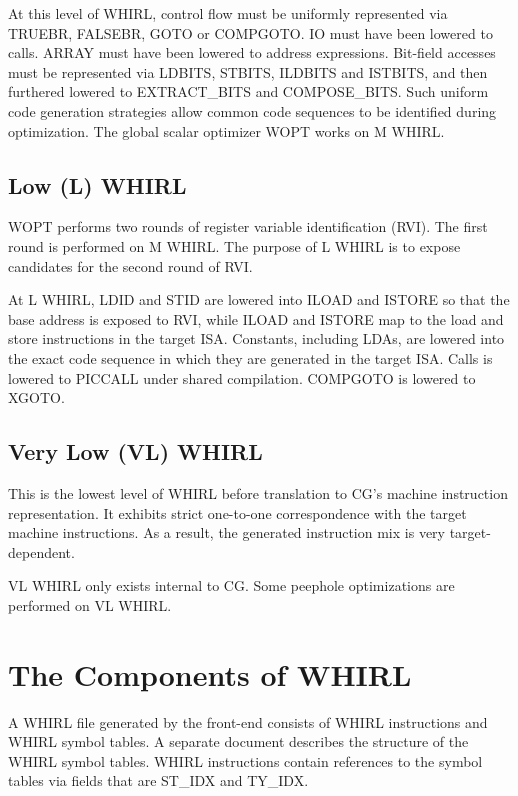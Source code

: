 \documentclass{article}
\begin{document}
At this level of WHIRL, control flow must be uniformly represented
via TRUEBR, FALSEBR, GOTO or COMPGOTO. IO must have been lowered
to calls.
ARRAY must have been lowered to address expressions. Bit-field accesses
must be represented via
LDBITS, STBITS, ILDBITS and ISTBITS, and then furthered lowered to
EXTRACT\_BITS and COMPOSE\_BITS. Such uniform code generation strategies
allow common code sequences to be
identified during optimization. The global scalar optimizer WOPT
works on M WHIRL.

\subsection{Low (L) WHIRL}

WOPT performs two rounds of register variable identification (RVI).
The first round is performed on M WHIRL. The purpose of L WHIRL is
to expose candidates for the second round of RVI. 

At L WHIRL, LDID
and STID are lowered into ILOAD and ISTORE so that the base address
is exposed to RVI, while
ILOAD and ISTORE map to the load and store instructions in the target
ISA. Constants, including
LDAs, are lowered into the exact code sequence in which they are
generated in
the target ISA. Calls is lowered to PICCALL under shared compilation.
COMPGOTO is lowered to XGOTO.

\subsection{Very Low (VL) WHIRL}

This is the lowest level of WHIRL before translation to CG's machine
instruction representation. It exhibits strict one-to-one
correspondence with the target machine instructions. As a result, the generated
instruction mix is very target-dependent.

VL WHIRL only exists internal to CG. Some peephole optimizations
are performed on VL WHIRL.

\section{The Components of WHIRL}

A WHIRL file generated by the front-end consists of WHIRL instructions
and WHIRL symbol tables. A separate document describes the structure of the WHIRL symbol tables. WHIRL instructions
contain references to the symbol tables via fields that are ST\_IDX
and TY\_IDX. 
\end{document}
